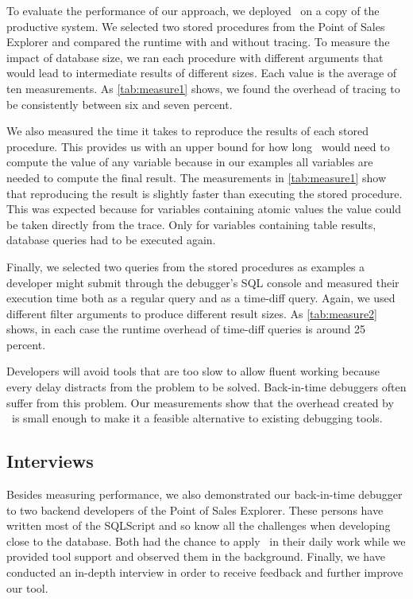 To evaluate the performance of our approach, we deployed \tool\ on a copy of the productive system.
We selected two stored procedures from the Point of Sales Explorer and compared the runtime with and without tracing.
To measure the impact of database size, we ran each procedure with different arguments that would lead to intermediate results of different sizes.
Each value is the average of ten measurements.
As \cref{tab:measure1} shows, we found the overhead of tracing to be consistently between six and seven percent.

We also measured the time it takes to reproduce the results of each stored procedure.
This provides us with an upper bound for how long \tool\ would need to compute the value of any variable because in our examples all variables are needed to compute the final result.
The measurements in \cref{tab:measure1} show that reproducing the result is slightly faster than executing the stored procedure.
This was expected because for variables containing atomic values the value could be taken directly from the trace.
Only for variables containing table results, database queries had to be executed again.

Finally, we selected two queries from the stored procedures as examples a developer might submit through the debugger's SQL console and measured their execution time both as a regular query and as a time-diff query.
Again, we used different filter arguments to produce different result sizes.
As \cref{tab:measure2} shows, in each case the runtime overhead of time-diff queries is around 25 percent.

Developers will avoid tools that are too slow to allow fluent working because every delay distracts from the problem to be solved. 
Back-in-time debuggers often suffer from this problem.
Our measurements show that the overhead created by \tool\ is small enough to make it a feasible alternative to existing debugging tools.

\subsection{Interviews}

Besides measuring performance, we also demonstrated our back-in-time debugger to two backend developers of the Point of Sales Explorer. 
These persons have written most of the SQLScript and so know all the challenges when developing close to the database. 
Both had the chance to apply \tool\ in their daily work while we provided tool support and observed them in the background. 
Finally, we have conducted an in-depth interview in order to receive feedback and further improve our tool.

